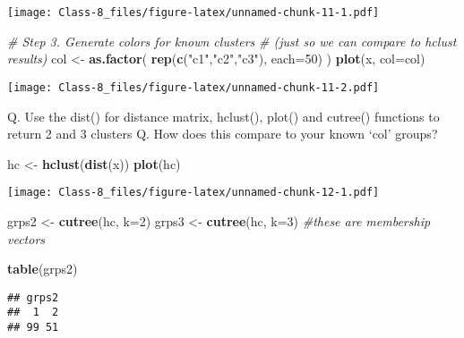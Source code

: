 \documentclass[]{article}
\newenvironment{Shaded}{\begin{snugshade}}{\end{snugshade}}
\newcommand{\CommentTok}[1]{\textcolor[rgb]{0.56,0.35,0.01}{\textit{#1}}}
\newcommand{\DataTypeTok}[1]{\textcolor[rgb]{0.13,0.29,0.53}{#1}}
\newcommand{\DecValTok}[1]{\textcolor[rgb]{0.00,0.00,0.81}{#1}}
\newcommand{\KeywordTok}[1]{\textcolor[rgb]{0.13,0.29,0.53}{\textbf{#1}}}
\newcommand{\NormalTok}[1]{#1}
\newcommand{\StringTok}[1]{\textcolor[rgb]{0.31,0.60,0.02}{#1}}
\begin{document}
\texttt{[image: Class-8\_files/figure-latex/unnamed-chunk-11-1.pdf]}

\begin{Shaded}
\begin{Highlighting}[]
\CommentTok{# Step 3. Generate colors for known clusters}
\CommentTok{# (just so we can compare to hclust results)}
\NormalTok{col <-}\StringTok{ }\KeywordTok{as.factor}\NormalTok{( }\KeywordTok{rep}\NormalTok{(}\KeywordTok{c}\NormalTok{(}\StringTok{"c1"}\NormalTok{,}\StringTok{"c2"}\NormalTok{,}\StringTok{"c3"}\NormalTok{), }\DataTypeTok{each=}\DecValTok{50}\NormalTok{) )}
\KeywordTok{plot}\NormalTok{(x, }\DataTypeTok{col=}\NormalTok{col)}
\end{Highlighting}
\end{Shaded}

\texttt{[image: Class-8\_files/figure-latex/unnamed-chunk-11-2.pdf]}

Q. Use the dist() for distance matrix, hclust(), plot() and cutree()
functions to return 2 and 3 clusters Q. How does this compare to your
known `col' groups?

\begin{Shaded}
\begin{Highlighting}[]
\NormalTok{hc <-}\StringTok{ }\KeywordTok{hclust}\NormalTok{(}\KeywordTok{dist}\NormalTok{(x))}
\KeywordTok{plot}\NormalTok{(hc)}
\end{Highlighting}
\end{Shaded}

\texttt{[image: Class-8\_files/figure-latex/unnamed-chunk-12-1.pdf]}

\begin{Shaded}
\begin{Highlighting}[]
\NormalTok{grps2 <-}\StringTok{ }\KeywordTok{cutree}\NormalTok{(hc, }\DataTypeTok{k=}\DecValTok{2}\NormalTok{)}
\NormalTok{grps3 <-}\StringTok{ }\KeywordTok{cutree}\NormalTok{(hc, }\DataTypeTok{k=}\DecValTok{3}\NormalTok{) }\CommentTok{#these are membership vectors}
\end{Highlighting}
\end{Shaded}

\begin{Shaded}
\begin{Highlighting}[]
\KeywordTok{table}\NormalTok{(grps2)}
\end{Highlighting}
\end{Shaded}

\begin{verbatim}
## grps2
##  1  2 
## 99 51
\end{verbatim}
\end{document}
